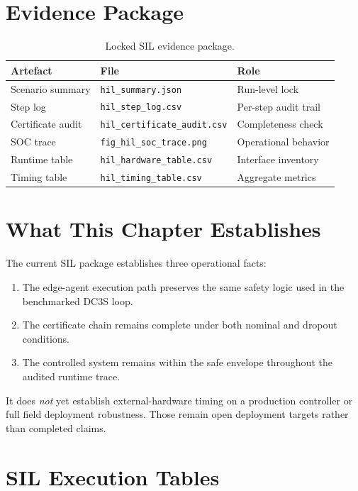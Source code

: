 \section{Evidence Package}

\begin{table}[ht]
\centering
\caption{Locked SIL evidence package.}
\label{tab:hil-evidence}
\begin{tabular}{lll}
\toprule
\textbf{Artefact} & \textbf{File} & \textbf{Role} \\
\midrule
Scenario summary & \texttt{hil\_summary.json} & Run-level lock \\
Step log & \texttt{hil\_step\_log.csv} & Per-step audit trail \\
Certificate audit & \texttt{hil\_certificate\_audit.csv} & Completeness check \\
SOC trace & \texttt{fig\_hil\_soc\_trace.png} & Operational behavior \\
Runtime table & \texttt{hil\_hardware\_table.csv} & Interface inventory \\
Timing table & \texttt{hil\_timing\_table.csv} & Aggregate metrics \\
\bottomrule
\end{tabular}
\end{table}

\section{What This Chapter Establishes}

The current SIL package establishes three operational facts:

\begin{enumerate}
  \item The edge-agent execution path preserves the same safety logic used in
    the benchmarked DC3S loop.
  \item The certificate chain remains complete under both nominal and dropout
    conditions.
  \item The controlled system remains within the safe envelope throughout the audited
    runtime trace.
\end{enumerate}

It does \emph{not} yet establish external-hardware timing on a production
controller or full field deployment robustness.  Those remain open deployment
targets rather than completed claims.

\section{SIL Execution Tables}

